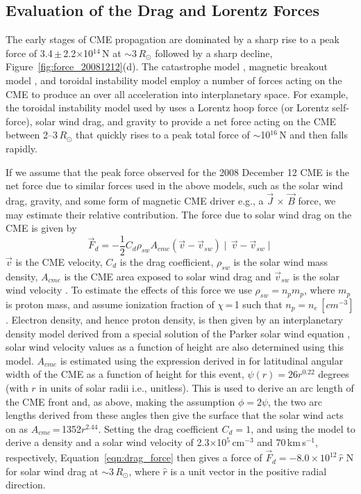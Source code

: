 \subsection{Evaluation of the Drag and Lorentz Forces}\label{sec:21}


The early stages of CME propagation are dominated by a sharp rise to a peak force of 3.4\,$\pm$\,2.2$\times$10$^{14}$\,N at $\sim$3\,$R_{\odot}$ followed by a sharp decline, Figure~\ref{fig:force_20081212}(d). The catastrophe model \citep{forbes1991,forbes1995,lin2000}, magnetic breakout model \citep{antio99,lynch2008}, and toroidal instability model \citep{chen1996,kleim2006} employ a number of forces acting on the CME to produce an over all acceleration into interplanetary space. For example, the toroidal instability model used by \citet{chen1996} uses a Lorentz hoop force (or Lorentz self-force), solar wind drag, and gravity to provide a net force acting on the CME between 2--3\,$R_{\odot}$ that quickly 
rises to a peak total force of $\sim$10$^{16}$\,N and then falls rapidly.

If we assume that the peak force observed for the 2008 December 12 CME is the net force due to similar forces used in the above models, such as the solar wind drag, gravity, and some form of magnetic CME driver e.g., a $\vec{J}\,\times\,\vec{B}$ force, we may estimate their relative contribution. The force due to solar wind drag on the CME is given by
\begin{equation}
\vec{F}_d=-\frac{1}{2}C_{d}\rho_{sw}A_{cme}(\vec{v}-\vec{v}_{sw})\mid\,\vec{v}-\vec{v}_{sw}\mid
\label{eqn:drag_force}
\end{equation}
$\vec{v}$ is the CME velocity, $C_{d}$ is the drag coefficient, $\rho_{sw}$ is the solar wind mass density, $A_{cme}$ is the CME area exposed to solar wind drag and $\vec{v}_{sw}$ is the solar wind velocity \citep{malo10}. To estimate the effects of this force we use $\rho_{sw}=n_{p}m_{p}$, where $m_{p}$ is proton mass, and assume ionization fraction of $\chi$\,=\,1 such that $n_{p}=n_{e}$\,$[cm^{-3}]$. Electron density, and hence proton density, is then given by an interplanetary density model derived from a special solution of the Parker solar wind equation \citep{Mann1999}, solar wind velocity values as a function of height are also determined using this model. $A_{cme}$ is estimated using the expression derived in \citet{byrne2010} for latitudinal angular width of the CME as a function of height for this event, $\psi(r)=26r^{0.22}$ degrees (with $r$ in units of solar radii i.e., unitless). This is used to derive an arc length of the CME front and, as above, making the assumption $\phi=2\psi$, the two arc lengths derived from these angles then give the surface that the solar wind acts on as $A_{cme}$\,=\,1352$r^{2.44}$. Setting the drag coefficient $C_{d}=1$, and using the \citet{Mann1999} model to derive a density and a solar wind velocity of 2.3$\times$10$^{5}$\,cm$^{-3}$  and 70\,km\,s$^{-1}$, respectively, Equation~\ref{eqn:drag_force} then gives a force of $\vec{F}_{d}=-8.0\times10^{12}\,\hat{r}\,$\,N for solar wind drag at $\sim$3\,$R_{\odot}$, where $\hat{r}$ is a unit vector in the positive radial direction. 

